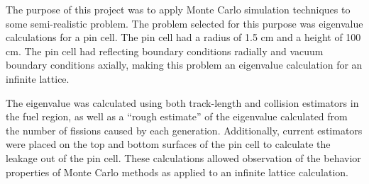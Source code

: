 
The purpose of this project was to apply Monte Carlo simulation techniques to some semi-realistic problem.  The problem selected for this purpose was eigenvalue calculations for a pin cell.  The pin cell had a radius of 1.5 cm and a height of 100 cm.  The pin cell had reflecting boundary conditions radially and vacuum boundary conditions axially, making this problem an eigenvalue calculation for an infinite lattice. 

The eigenvalue was calculated using both track-length and collision estimators in the fuel region, as well as a ``rough estimate'' of the eigenvalue calculated from the number of fissions caused by each generation.  Additionally, current estimators were placed on the top and bottom surfaces of the pin cell to calculate the leakage out of the pin cell.  These calculations allowed observation of the behavior properties of Monte Carlo methods as applied to an infinite lattice calculation.